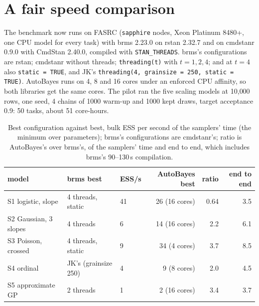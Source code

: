 \documentclass[11pt]{article}
\newcommand{\code}[1]{\texttt{#1}}
\begin{document}
\section{A fair speed comparison}
\label{sec:speed}

The benchmark now runs on FASRC (\code{sapphire} nodes, Xeon Platinum 8480+, one CPU model for every task) with brms
2.23.0 on rstan 2.32.7 and on cmdstanr 0.9.0 with CmdStan 2.40.0, compiled with \code{STAN\_THREADS}. brms's
configurations are rstan; cmdstanr without threads; \code{threading(t)} with $t = 1, 2, 4$; and at $t = 4$ also
\code{static = TRUE}, and JK's \code{threading(4, grainsize = 250, static = TRUE)}. AutoBayes runs on 4, 8 and 16 cores
under an enforced CPU affinity, so both libraries get the same cores. The pilot ran the five scaling models at 10{,}000
rows, one seed, 4 chains of 1000 warm-up and 1000 kept draws, target acceptance 0.9: 50 tasks, about 51 core-hours.

\begin{table}[h]
\small
\begin{center}\begin{tabular}{@{}lllrrr@{}}
\toprule
model & brms best & ESS/s & AutoBayes best & ratio & end to end \\
\midrule
S1 logistic, slope & 4 threads, static & 41 & 26 (16 cores) & 0.64 & 3.5 \\
S2 Gaussian, 3 slopes & 4 threads & 6 & 14 (16 cores) & 2.2 & 6.1 \\
S3 Poisson, crossed & 4 threads, static & 9 & 34 (4 cores) & 3.7 & 8.5 \\
S4 ordinal & JK's (grainsize 250) & 4 & 9 (8 cores) & 2.0 & 4.5 \\
S5 approximate GP & 2 threads & 1 & 2 (16 cores) & 3.4 & 3.7 \\
\bottomrule
\end{tabular}\end{center}
\caption{\small Best configuration against best, bulk ESS per second of the samplers' time (the minimum over parameters);
brms's configurations are cmdstanr's; ratio is AutoBayes's over brms's, of the samplers' time and end to end, which includes brms's 90--130\,s compilation.}\label{tab:pilot}
\end{table}
\end{document}
